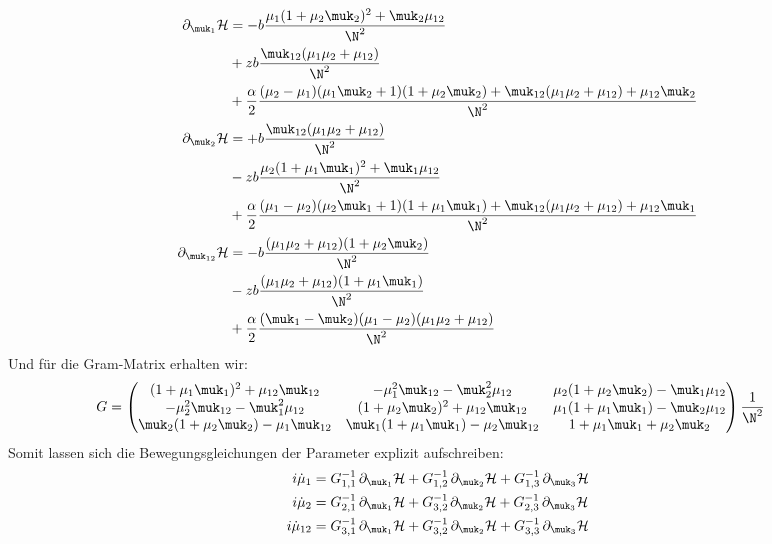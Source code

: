 \begin{align}
    \partial_{\muk_1} \mathcal{H} &= 
    -b \frac{\mu_1(1+\mu_2\muk_2)^2 + \muk_2\mu_{12}}{\N^2}\nonumber\\
    &+z b \frac{\muk_{12}(\mu_1\mu_2 + \mu_{12})}{\N^2}\nonumber\\
    &+\frac{\alpha}{2}\frac{(\mu_2-\mu_1)(\mu_1\muk_2+1)(1+\mu_2\muk_2)+\muk_{12}(\mu_1\mu_2 + \mu_{12}) + \mu_{12}\muk_2}{\N^2}\label{dH_Q1} \\
    \partial_{\muk_2} \mathcal{H} &= 
    +b \frac{\muk_{12}(\mu_1\mu_2 + \mu_{12})}{\N^2} \nonumber\\
    &-z b \frac{\mu_2(1+\mu_1\muk_1)^2 + \muk_1\mu_{12}}{\N^2} \nonumber\\
    &+\frac{\alpha}{2}\frac{(\mu_1-\mu_2)(\mu_2\muk_1+1)(1+\mu_1\muk_1)+\muk_{12}(\mu_1\mu_2 + \mu_{12}) + \mu_{12}\muk_1}{\N^2} \\
    \partial_{\muk_{12}} \mathcal{H} &= 
    -b\frac{(\mu_1\mu_2+\mu_{12})(1+\mu_2\muk_2)}{\N^2} \nonumber\\
    &-zb\frac{(\mu_1\mu_2+\mu_{12})(1+\mu_1\muk_1)}{\N^2} \nonumber\\
    &+\frac{\alpha}{2}\frac{(\muk_1-\muk_2)(\mu_1-\mu_2)(\mu_1\mu_2+\mu_{12})}{\N^2}\label{dH_Q12}
\end{align}
\noindent Und für die Gram-Matrix erhalten wir:
\begin{align}\label{Gram_Korrektur}
    G &=
    \begin{pmatrix}
        (1+\mu_1\muk_1)^2 + \mu_{12}\muk_{12} & -\mu_1^2\muk_{12} - \muk_2^2\mu_{12} &  \mu_2(1+\mu_2\muk_2)-\muk_1\mu_{12}\\
        -\mu_2^2\muk_{12} - \muk_1^2\mu_{12} &(1+\mu_2\muk_2)^2 + \mu_{12}\muk_{12} & \mu_1(1+\mu_1\muk_1)-\muk_2\mu_{12}\\
        \muk_2(1+\mu_2\muk_2)-\mu_1\muk_{12} & \muk_1(1+\mu_1\muk_1)-\mu_2\muk_{12} & 1 + \mu_1\muk_1 + \mu_2\muk_2
    \end{pmatrix}\frac{1}{\N^2} 
\end{align}
Somit lassen sich die Bewegungsgleichungen der Parameter explizit aufschreiben:
\begin{align}
    i\dot{\mu}_1 &= G_{1,1}^{-1}\thinspace \partial_{\muk_1}\mathcal{H} + G_{1,2}^{-1}\thinspace\partial_{\muk_2}\mathcal{H} + G_{1,3}^{-1}\thinspace\partial_{\muk_3}\mathcal{H}\label{QK_DGL1} \\
    i\dot{\mu}_2 &= G_{2,1}^{-1}\thinspace\partial_{\muk_1}\mathcal{H} + G_{3,2}^{-1\thinspace}\partial_{\muk_2}\mathcal{H} + G_{2,3}^{-1}\thinspace\partial_{\muk_3}\mathcal{H} \\
    i\dot{\mu}_{12} &= G_{3,1}^{-1}\thinspace\partial_{\muk_1}\mathcal{H} + G_{3,2}^{-1}\thinspace\partial_{\muk_2}\mathcal{H} + G_{3,3}^{-1}\thinspace\partial_{\muk_3}\mathcal{H} \label{QK_DGL3}
\end{align}





